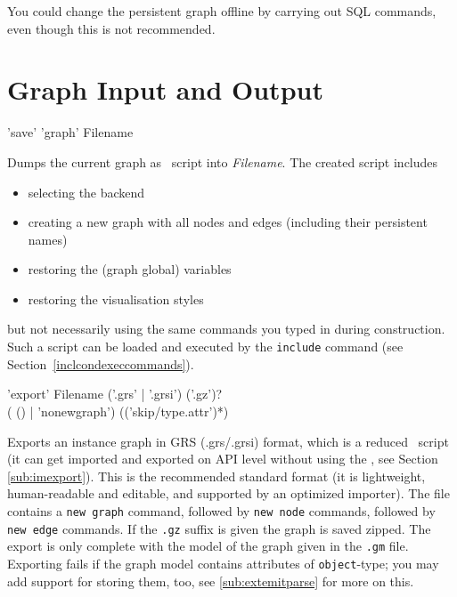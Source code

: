 You could change the persistent graph offline by carrying out SQL commands, even though this is not recommended.


\section{Graph Input and Output}
\label{outputcmds}

\begin{rail}
  'save' 'graph' Filename
\end{rail}
Dumps the current graph as \GrShell\ script into \emph{Filename}.
The created script includes
\begin{itemize}
  \item selecting the backend
  \item creating a new graph with all nodes and edges (including their persistent names)
  \item restoring the (graph global) variables
  \item restoring the visualisation styles
\end{itemize}
but not necessarily using the same commands you typed in during construction.
Such a script can be loaded and executed by the \texttt{include} command (see Section~\ref{inclcondexeccommands}).

\begin{rail}
  'export' Filename ('.grs' | '.grsi') ('.gz')? \\ ( () | 'nonewgraph') (('skip/type.attr')*)
\end{rail}
Exports an instance graph in GRS (.grs/.grsi) format, which is a reduced \GrShell\ script
(it can get imported and exported on API level without using the \GrShell, see Section \ref{sub:imexport}).
This is the recommended standard format (it is lightweight, human-readable and editable, and supported by an optimized importer).
The file contains a \texttt{new graph} command, followed by \texttt{new node} commands, followed by \texttt{new edge} commands.
If the \texttt{.gz} suffix is given the graph is saved zipped.
The export is only complete with the model of the graph given in the \texttt{.gm} file.
Exporting fails if the graph model contains attributes of \texttt{object}-type; you may add support for storing them, too, see \ref{sub:extemitparse} for more on this.

